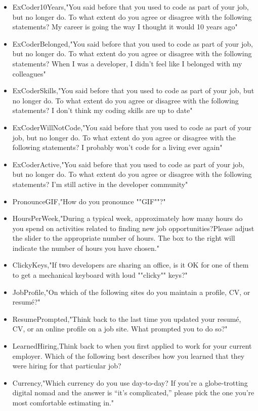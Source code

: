 \begin{appendices}
\begin{itemize}
        \item ExCoder10Years,"You said before that you used to code as part of your job, but no longer do. To what extent do you agree or disagree with the following statements? My career is going the way I thought it would 10 years ago"
        \item ExCoderBelonged,"You said before that you used to code as part of your job, but no longer do. To what extent do you agree or disagree with the following statements? When I was a developer, I didn't feel like I belonged with my colleagues"
        \item ExCoderSkills,"You said before that you used to code as part of your job, but no longer do. To what extent do you agree or disagree with the following statements? I don't think my coding skills are up to date"
        \item ExCoderWillNotCode,"You said before that you used to code as part of your job, but no longer do. To what extent do you agree or disagree with the following statements? I probably won't code for a living ever again"
        \item ExCoderActive,"You said before that you used to code as part of your job, but no longer do. To what extent do you agree or disagree with the following statements? I'm still active in the developer community"
        \item PronounceGIF,"How do you pronounce ""GIF""?"
        \item HoursPerWeek,"During a typical week, approximately how many hours do you spend on activities related to finding new job opportunities?Please adjust the slider to the appropriate number of hours. The box to the right will indicate the number of hours you have chosen."
        \item ClickyKeys,"If two developers are sharing an office, is it OK for one of them to get a mechanical keyboard with loud ""clicky"" keys?"
        \item JobProfile,"On which of the following sites do you maintain a profile, CV, or resumé?"
        \item ResumePrompted,"Think back to the last time you updated your resumé, CV, or an online profile on a job site. What prompted you to do so?"
        \item LearnedHiring,Think back to when you first applied to work for your current employer. Which of the following best describes how you learned that they were hiring for that particular job?
        \item Currency,"Which currency do you use day-to-day? If you're a globe-trotting digital nomad and the answer is “it's complicated,” please pick the one you're most comfortable estimating in."

\end{itemize}
\end{appendices}
